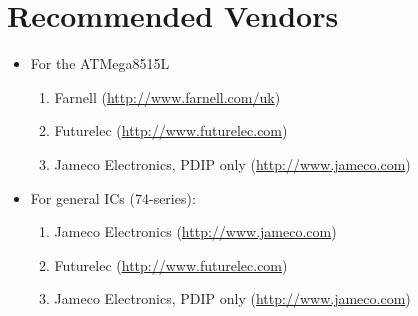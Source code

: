 \section{Recommended Vendors}

\begin{itemize}
\item For the ATMega8515L
\begin{enumerate}
	\item Farnell (\url{http://www.farnell.com/uk})
	\item Futurelec (\url{http://www.futurelec.com})
	\item Jameco Electronics, PDIP only (\url{http://www.jameco.com})
\end{enumerate}

\item For general ICs (74-series):
\begin{enumerate}
	\item Jameco Electronics (\url{http://www.jameco.com})
	\item Futurelec (\url{http://www.futurelec.com})
	\item Jameco Electronics, PDIP only (\url{http://www.jameco.com})
\end{enumerate}
\end{itemize}

